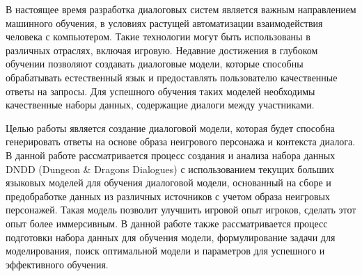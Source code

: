 В настоящее время разработка диалоговых систем является важным направлением машинного обучения, в условиях растущей автоматизации взаимодействия человека с компьютером. Такие технологии могут быть использованы в различных отраслях, включая игровую. Недавние достижения в глубоком обучении позволяют создавать диалоговые модели, которые способны обрабатывать естественный язык и предоставлять пользователю качественные ответы на запросы. Для успешного обучения таких моделей необходимы качественные наборы данных, содержащие диалоги между участниками. 

Целью работы является создание диалоговой модели, которая будет способна генерировать ответы на основе образа неигрового персонажа и контекста диалога. В данной работе рассматривается процесс создания и анализа набора данных DNDD (Dungeon \& Dragons Dialogues) с использованием текущих больших языковых моделей для обучения диалоговой модели, основанный на сборе и предобработке данных из различных источников с учетом образа неигровых персонажей. Такая модель позволит улучшить игровой опыт игроков, сделать этот опыт более иммерсивным. В данной работе также рассматривается процесс подготовки набора данных для обучения модели, формулирование задачи для моделирования, поиск оптимальной модели и параметров для успешного и эффективного обучения.